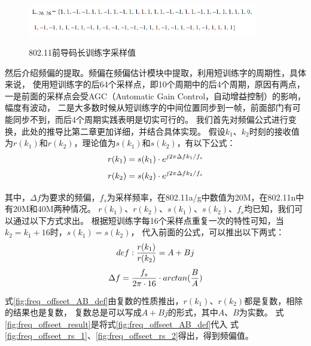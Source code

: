 			\begin{figure}
				\centering
				\includegraphics[width=0.9\textwidth]{img/80211_lts_sequence.png}
				\caption{802.11前导码长训练字采样值}
				\label{fig:80211_lts_sequence}
				\cite{ieee80211}
			\end{figure}

		然后介绍频偏的提取。频偏在频偏估计模块中提取，利用短训练字的周期性，具体来说，
		使用短训练字的后64个采样点，即10个周期中的后4个周期，原因有两点，
		一是前面的采样点会受AGC（Automatic Gain Control，自动增益控制）的影响，幅度有波动，
		二是大多数时候从短训练字的中间位置同步到一帧，前面部门有可能同步不到，而后4个周期实践表明是切实可行的。
		我们首先对频偏公式进行变换，此处的推导比第二章更加详细，并结合具体实现。
		假设$k_1$、$k_2$时刻的接收值为$r(k_1)$和$r(k_2)$，理论值为$s(k_1)$和$s(k_2)$，有以下公式：
			\begin{equation}
				\centering
				r(k_1)=s(k_1) \cdot e^{j2 \pi \Delta fk_1 / f_s}
				\label{fig:freq_offseet_rs_1}
			\end{equation}
			\begin{equation}
				\centering
				r(k_2)=s(k_2) \cdot e^{j2 \pi \Delta fk_2 / f_s}
				\label{fig:freq_offseet_rs_2}
			\end{equation}

		其中，$\Delta f$为要求的频偏，$f_s$为采样频率，在802.11a/g中数值为20M，在802.11n中有20M和40M两种情况。
		$r(k_1)$、$r(k_2)$、$s(k_1)$、$s(k_2)$、$f_s$均已知，我们可以通过以下方式求出。
		根据短训练字每16个采样点重复一次的特性可知，当$k_2 = k_1 + 16$时，$s(k_1) = s(k_2)$，
		代入前面的公式，可以推出以下两式：
			\begin{equation}
				\centering
				def: \frac{r(k_1)}{r(k_2)} = A + Bj
				\label{fig:freq_offseet_AB_def}
			\end{equation}
			\begin{equation}
				\centering
				\Delta f = \frac{f_s}{2\pi \cdot 16} \cdot arctan(\frac{B}{A})
				\label{fig:freq_offseet_result}
			\end{equation}

		式\ref{fig:freq_offseet_AB_def}由复数的性质推出，$r(k_1)$、$r(k_2)$都是复数，相除的结果也是复数，
		复数总是可以写成$A + Bj$的形式，其中$A$、$B$为实数。
		式\ref{fig:freq_offseet_result}是将式\ref{fig:freq_offseet_AB_def}代入
		式\ref{fig:freq_offseet_rs_1}、\ref{fig:freq_offseet_rs_2}得出，得到频偏值。

